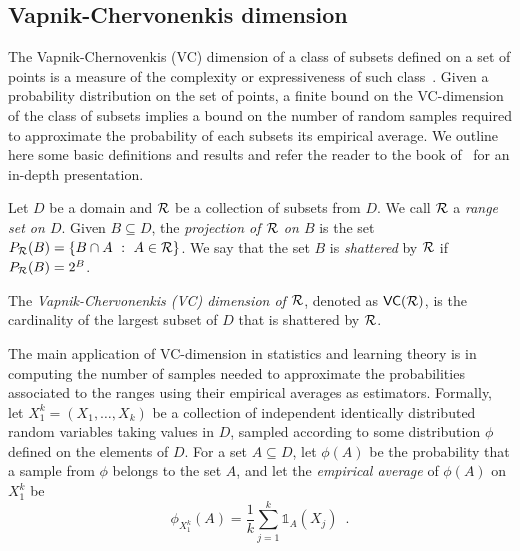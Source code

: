 \subsection{Vapnik-Chervonenkis dimension}\label{sec:prelvcdim}
The Vapnik-Chernovenkis (VC) dimension of a class of subsets defined
on a set of points is a measure of the complexity or expressiveness of such
class~\citep{VapnikC71}. Given a probability distribution on the set of points,
a finite bound on the VC-dimension of the class of subsets implies a bound on
the number of random samples required to approximate the probability of each
subsets its empirical average. We outline here some basic definitions and
results and refer the reader to the book of~\citet{MohriRT12} for an in-depth
presentation.

Let $D$ be a domain and $\mathcal{R}$ be a collection of subsets from $D$. We call
$\mathcal{R}$ a \emph{range set on $D$}.
Given $B\subseteq D$, the \emph{projection of $\mathcal{R}$ on $B$} is the set 
$P_{\mathcal{R}}(B)=\{ B\cap A ~:~ A\in\mathcal{R}\}$. We say that the set $B$ is
\emph{shattered} by $\mathcal{R}$ if $P_{\mathcal{R}}(B)=2^B$.

\begin{definition}\label{def:vcdim}
  The \emph{Vapnik-Chervonenkis (VC) dimension of $\mathcal{R}$}, denoted as
  $\mathsf{VC}(\mathcal{R})$, is the cardinality of the largest subset of $D$ that is
  shattered by $\mathcal{R}$.
\end{definition}

The main application of VC-dimension in statistics and learning
theory is in computing the number of samples needed to approximate the
probabilities associated to the ranges using their empirical averages as
estimators. Formally, let $X_1^k=(X_1,\dotsc,X_k)$ be a collection of
independent identically distributed random variables taking values in $D$,
sampled according to some distribution $\phi$ defined on the elements of $D$.
For a set $A\subseteq D$, let $\phi(A)$ be the probability that a sample from
$\phi$ belongs to the set $A$, and let the \emph{empirical average} of $\phi(A)$
on $X_1^k$ be 
\[
\phi_{X_1^k}(A)=\frac{1}{k}\sum_{j=1}^k\mathds{1}_A(X_j)\enspace.%
\]


